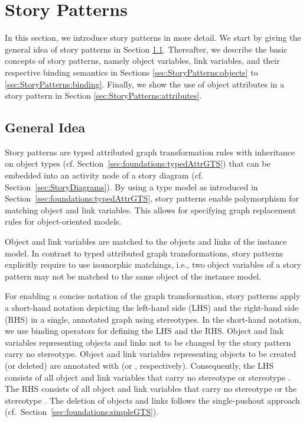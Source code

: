 \section{Story Patterns} 
\label{sec:StoryPatterns}

In this section, we introduce story patterns in more detail.
We start by giving the general idea of story patterns in Section \ref{sec:StoryPatterns:storyPattern}.
Thereafter, we describe the basic concepts of story patterns, namely object variables, link variables,
and their respective binding semantics in Sections \ref{sec:StoryPatterns:objects} to \ref{sec:StoryPatterns:binding}.
Finally, we show the use of object attributes in a story pattern in Section \ref{sec:StoryPatterns:attributes}.


\subsection{General Idea}
\label{sec:StoryPatterns:storyPattern}

Story patterns are typed attributed graph transformation rules with inheritance on object types (cf. Section~\ref{sec:foundations:typedAttrGTS}) that can be embedded into an activity node of a story diagram (cf. Section~\ref{sec:StoryDiagrams}).
 By using a type model as introduced in Section~\ref{sec:foundations:typedAttrGTS}, story patterns enable polymorphism for matching object and link variables.
This allows for specifying graph replacement rules for object-oriented models.

Object and link variables are matched to the objects and links of the instance model. 
In contrast to typed attributed graph transformations, story patterns explicitly require to use isomorphic matchings, i.e., two object variables of a story pattern may not be matched to the same object of the instance model.

For enabling a concise notation of the graph transformation, story patterns apply a short-hand notation depicting the left-hand side (LHS) and the right-hand side (RHS) in a single, annotated graph using stereotypes.
In the short-hand notation, we use binding operators for defining the LHS and the RHS. Object and link variables representing objects and links not to be changed by the story pattern carry no stereotype. 
Object and link variables representing objects to be created (or deleted) are annotated with \create (or  \destroy, respectively). 
Consequently, the LHS consists of all object and link variables that carry no stereotype or stereotype \destroy. The RHS consists of all object and link variables that carry no stereotype or the stereotype \create.
The deletion of objects and links follows the single-pushout approach (cf.\ Section~\ref{sec:foundations:simpleGTS}).

